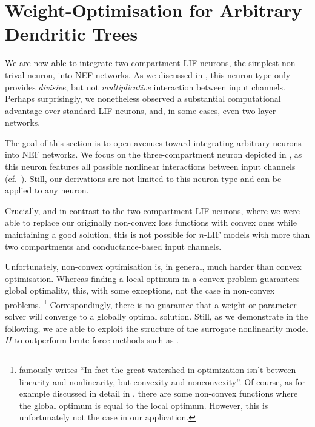 
\section{Weight-Optimisation for Arbitrary Dendritic Trees}
\label{sec:nlif_opt}

We are now able to integrate two-compartment LIF neurons, the simplest non-trival \nlif neuron, into NEF networks.
As we discussed in , this neuron type only provides \emph{divisive}, but not \emph{multiplicative} interaction between input channels.
Perhaps surprisingly, we nonetheless observed a substantial computational advantage over standard LIF neurons, and, in some cases, even two-layer networks.

The goal of this section is to open avenues toward integrating arbitrary \nlif neurons into NEF networks.
We focus on the three-compartment neuron depicted in , as this neuron features all possible nonlinear interactions between input channels (cf.~).
Still, our derivations are not limited to this neuron type and can be applied to any \nlif neuron.

Crucially, and in contrast to the two-compartment LIF neurons, where we were able to replace our originally non-convex loss functions with convex ones while maintaining a good solution, this is not possible for $n$-LIF models with more than two compartments and conductance-based input channels.

Unfortunately, non-convex optimisation is, in general, much harder than convex optimisation.
Whereas finding a local optimum in a convex problem guarantees global optimality, this, with some exceptions, not the case in non-convex problems.%
\footnote{\citet{rockafellar1993lagrange} famously writes \enquote{In fact the great watershed in optimization isn't between linearity and nonlinearity, but convexity and
nonconvexity}.
Of course, as for example discussed in detail in \citet{sun2016when}, there are some non-convex functions where the global optimum is equal to the local optimum.
However, this is unfortunately not the case in our application.
}
Correspondingly, there is no guarantee that a weight or parameter solver will converge to a globally optimal solution.
Still, as we demonstrate in the following, we are able to exploit the structure of the surrogate nonlinearity model $H$ to outperform brute-force methods such as .

